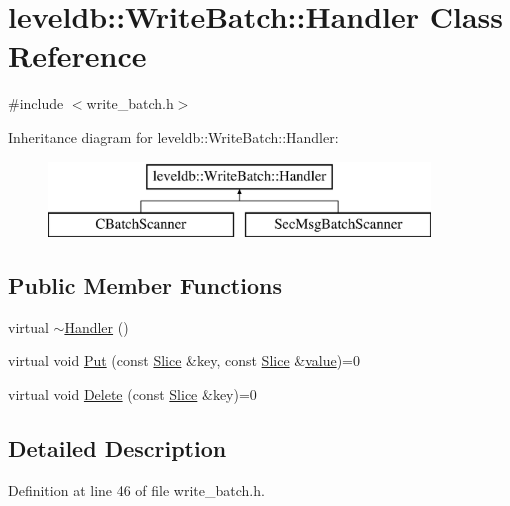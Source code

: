 \hypertarget{classleveldb_1_1_write_batch_1_1_handler}{}\section{leveldb\+:\+:Write\+Batch\+:\+:Handler Class Reference}
\label{classleveldb_1_1_write_batch_1_1_handler}


{\ttfamily \#include $<$write\+\_\+batch.\+h$>$}

Inheritance diagram for leveldb\+:\+:Write\+Batch\+:\+:Handler\+:\begin{figure}[H]
\begin{center}
\leavevmode
\includegraphics[height=2.000000cm]{classleveldb_1_1_write_batch_1_1_handler}
\end{center}
\end{figure}
\subsection*{Public Member Functions}
\begin{DoxyCompactItemize}
\item 
virtual \hyperlink{classleveldb_1_1_write_batch_1_1_handler_a85fd79c7fb47ef448719379499c5d090}{$\sim$\+Handler} ()
\item 
virtual void \hyperlink{classleveldb_1_1_write_batch_1_1_handler_ad41d4985db289b94e29921167d206d4b}{Put} (const \hyperlink{classleveldb_1_1_slice}{Slice} \&key, const \hyperlink{classleveldb_1_1_slice}{Slice} \&\hyperlink{cache_8cc_a0f61d63b009d0880a89c843bd50d8d76}{value})=0
\item 
virtual void \hyperlink{classleveldb_1_1_write_batch_1_1_handler_aeab6526b87bf5b50fb64216b69b34b17}{Delete} (const \hyperlink{classleveldb_1_1_slice}{Slice} \&key)=0
\end{DoxyCompactItemize}


\subsection{Detailed Description}


Definition at line 46 of file write\+\_\+batch.\+h.



